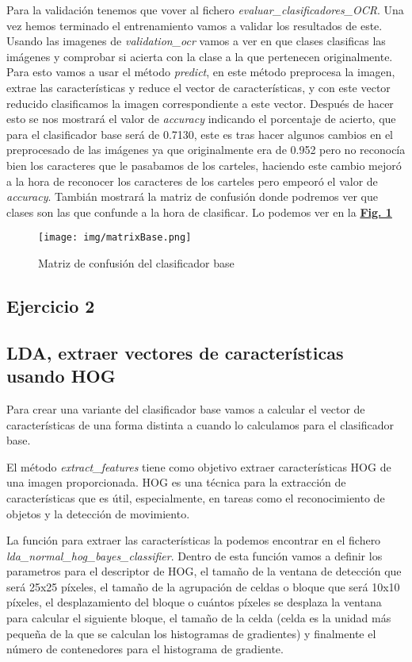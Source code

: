 \documentclass[a4paper, 12pt]{article}
\begin{document}
Para la validación tenemos que vover al fichero \textit{evaluar\_clasificadores\_OCR}. Una vez hemos terminado el entrenamiento vamos a validar los resultados de este. Usando las imagenes de \textit{validation\_ocr} vamos a ver en que clases clasificas las imágenes y comprobar si acierta con la clase a la que pertenecen originalmente. Para esto vamos a usar el método \textit{predict}, en este método preprocesa la imagen, extrae las características y reduce el vector de características, y con este vector reducido clasificamos la imagen correspondiente a este vector. Después de hacer esto se nos mostrará el valor de \textit{accuracy} indicando el porcentaje de acierto, que para el clasificador base será de 0.7130, este es tras hacer algunos cambios en el preprocesado de las imágenes ya que originalmente era de 0.952 pero no reconocía bien los caracteres que le pasabamos de los carteles, haciendo este cambio mejoró a la hora de reconocer los caracteres de los carteles pero empeoró el valor de \textit{accuracy}. Tambián mostrará la matriz de confusión donde podremos ver que clases son las que confunde a la hora de clasificar. 
Lo podemos ver en la \textbf{\hyperref[fig:normalizacion]{Fig. 1}}

\begin{figure}[h]
	\centering
	\texttt{[image: img/matrixBase.png]}
 	\caption{Matriz de confusión del clasificador base}\vspace{0.5cm}
	\label{fig:normalizacion}
\end{figure}


\subsection{Ejercicio 2}

\subsection{LDA, extraer vectores de características usando HOG}
Para crear una variante del clasificador base vamos a calcular el vector de características de una forma distinta a cuando lo calculamos para el clasificador base. 

El método \textit{extract\_features} tiene como objetivo extraer características HOG de una imagen proporcionada. HOG es una técnica para la extracción de características que es útil, especialmente, en tareas como el reconocimiento de objetos y la detección de movimiento.

La función para extraer las características la podemos encontrar en el fichero \textit{lda\_normal\_hog\_bayes\_classifier}. Dentro de esta función vamos a definir los parametros para el descriptor de HOG, el tamaño de la ventana de detección que será 25x25 píxeles, el tamaño de la agrupación de celdas o bloque que será 10x10 píxeles, el desplazamiento del bloque o cuántos píxeles se desplaza la ventana para calcular el siguiente bloque, el tamaño de la celda (celda es la unidad más pequeña de la que se calculan los histogramas de gradientes) y finalmente el número de contenedores para el histograma de gradiente. 
\end{document}
